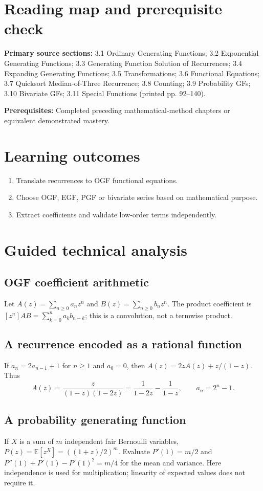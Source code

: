 \documentclass[11pt]{article}
\providecommand{\Expect}{\mathbb{E}}
\begin{document}
\makedoctocpage
\section{Reading map and prerequisite check}
\noindent\textbf{Primary source sections:} 3.1 Ordinary Generating Functions; 3.2 Exponential Generating Functions; 3.3 Generating Function Solution of Recurrences; 3.4 Expanding Generating Functions; 3.5 Transformations; 3.6 Functional Equations; 3.7 Quicksort Median-of-Three Recurrence; 3.8 Counting; 3.9 Probability GFs; 3.10 Bivariate GFs; 3.11 Special Functions (printed pp. 92--140).\par
\noindent\textbf{Prerequisites:} Completed preceding mathematical-method chapters or equivalent demonstrated mastery.\par
\section{Learning outcomes}
\begin{enumerate}
\item Translate recurrences to OGF functional equations.
\item Choose OGF, EGF, PGF or bivariate series based on mathematical purpose.
\item Extract coefficients and validate low-order terms independently.
\end{enumerate}
\section{Guided technical analysis}
\subsection{OGF coefficient arithmetic}
Let $A(z)=\sum_{n\ge0}a_nz^n$ and $B(z)=\sum_{n\ge0}b_nz^n$. The product coefficient is $[z^n]AB=\sum_{k=0}^n a_kb_{n-k}$; this is a convolution, not a termwise product.
\subsection{A recurrence encoded as a rational function}
If $a_n=2a_{n-1}+1$ for $n\ge1$ and $a_0=0$, then $A(z)=2zA(z)+z/(1-z)$. Thus
\[
A(z)=\frac{z}{(1-z)(1-2z)}=\frac{1}{1-2z}-\frac{1}{1-z},\qquad a_n=2^n-1.
\]
\subsection{A probability generating function}
If $X$ is a sum of $m$ independent fair Bernoulli variables, $P(z)=\Expect[z^X]=((1+z)/2)^m$. Evaluate $P'(1)=m/2$ and $P''(1)+P'(1)-P'(1)^2=m/4$ for the mean and variance. Here independence is used for multiplication; linearity of expected values does not require it.
\end{document}
